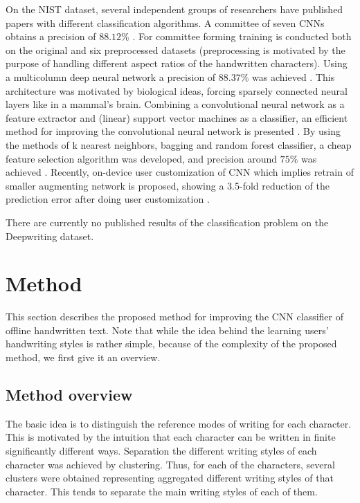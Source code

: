 \documentclass{article}
\begin{document}
On the NIST dataset, several independent groups of researchers have published papers with different classification algorithms.
A committee of seven CNNs obtains a precision of $88.12\%$ \citep{nist1}.
For committee forming training is conducted both on the original and six preprocessed datasets
(preprocessing is motivated by the purpose of handling different aspect ratios of the handwritten characters).
Using a multicolumn deep neural network a precision of $88.37\%$ was achieved \citep{nist2}.
This architecture was motivated by biological ideas, forcing sparsely connected neural layers like in a mammal's brain.
Combining a convolutional neural network as a feature extractor and (linear) support vector machines as a classifier,
an efficient method for improving the convolutional neural network is presented \citep{nist3}.
By using the methods of k nearest neighbors, bagging and random forest classifier, a cheap feature selection algorithm was developed,
and precision around $75\%$ was achieved \citep{nist4}.
Recently, on-device user customization of CNN which implies retrain of smaller augmenting network is proposed,
showing a 3.5-fold reduction of the prediction error after doing user customization \citep{nist5}.

There are currently no published results of the classification problem on the Deepwriting dataset.

\section{Method}

This section describes the proposed method for improving the CNN classifier of offline handwritten text.
Note that while the idea behind the learning users' handwriting styles is rather simple, because of the complexity of the proposed method, we first give it an overview. 

\subsection{Method overview}

The basic idea is to distinguish the reference modes %
of writing for each character.
This is motivated by the intuition that each character can be written in finite significantly different ways.
Separation the different writing styles of each character was achieved by clustering. 
Thus, for each of the characters, several clusters were obtained representing aggregated different writing styles of that character.
This tends to separate the main writing styles of each of them. 
\end{document}
